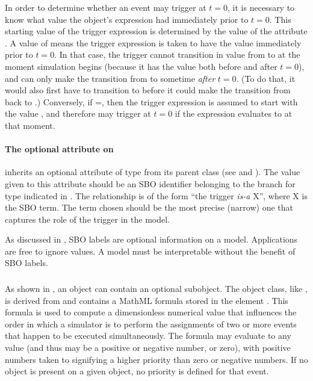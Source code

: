 In order to determine whether an event may trigger at $t = 0$, it is
necessary to know what value the \Trigger object's 
expression had immediately prior to $t = 0$.  This starting value
of the trigger expression is determined by the value of the
 attribute .  A value of 
means the trigger expression is taken to have the value 
immediately prior to $t = 0$.  In that case, the trigger cannot
transition in value from  to  at the moment
simulation begins (because it has the value  both before
and after $t = 0$), and can only make the transition from
 to  sometime \emph{after} $t = 0$.  (To do
that, it would also first have to transition to  before
it could make the transition from  back to .)
Conversely, if =, then the trigger
expression is assumed to start with the value , and
therefore may trigger at $t = 0$ if the expression evaluates to
 at that moment.


\paragraph{The optional  attribute on \Trigger}
\label{sec:trigger-sboterm}

\Trigger inherits an optional  attribute of type
 from its parent class \SBase (see
 and ).  The value
given to this attribute should be an SBO identifier belonging to
the branch for type \Trigger indicated in
.  The relationship is of the
form ``the trigger \emph{is-a} X'', where X is the SBO term.  The
term chosen should be the most precise (narrow) one that captures
the role of the trigger in the model.

As discussed in , SBO labels are optional
information on a model.  Applications are free to ignore
 values.  A model must be interpretable without the
benefit of SBO labels.

\subsubsection{}
\label{sec:event-priority}

As shown in , an \Event object can contain
an optional \Priority subobject.  The \Priority object class, like
\Delay, is derived from \SBase and contains a MathML formula
stored in the element .  This formula is used to
compute a dimensionless numerical value that influences the order
in which a simulator is to perform the assignments of two or more
events that happen to be executed simultaneously.  The formula may
evaluate to any  value (and thus may be a positive
or negative number, or zero), with positive numbers taken to
signifying a higher priority than zero or negative numbers.  If no
\Priority object is present on a given \Event object, no priority
is defined for that event.

